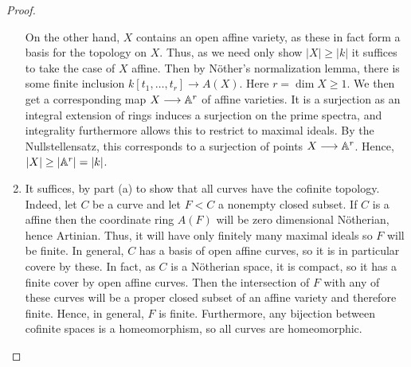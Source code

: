 \begin{proof}
\begin{enumerate}[label = (\alph*)]
        On the other hand, $X$ contains an open affine variety, as these in fact form a basis for the topology on $X$. Thus, as we need only show $|X| \geq |k|$ it suffices to take the case of $X$ affine. Then by N\"other's normalization lemma, there is some finite inclusion $k[t_1, \dots, t_r] \longrightarrow A(X)$. Here $r = \dim X \geq 1$. We then get a corresponding map $X \longrightarrow \mathbb A^r$ of affine varieties. It is a surjection as an integral extension of rings induces a surjection on the prime spectra, and integrality furthermore allows this to restrict to maximal ideals. By the Nullstellensatz, this corresponds to a surjection of points $X \longrightarrow \mathbb A^r$. Hence, $|X| \geq |\mathbb A^r| = |k|$.

        \item It suffices, by part (a) to show that all curves have the cofinite topology. Indeed, let $C$ be a curve and let $F < C$ a nonempty closed subset. If $C$ is a affine then the coordinate ring $A(F)$ will be zero dimensional N\"otherian, hence Artinian. Thus, it will have only finitely many maximal ideals so $F$ will be finite. In general, $C$ has a basis of open affine curves, so it is in particular covere by these. In fact, as $C$ is a N\"otherian space, it is compact, so it has a finite cover by open affine curves. Then the intersection of $F$ with any of these curves will be a proper closed subset of an affine variety and therefore finite. Hence, in general, $F$ is finite. Furthermore, any bijection between cofinite spaces is a homeomorphism, so all curves are homeomorphic.
    \end{enumerate}
\end{proof}
